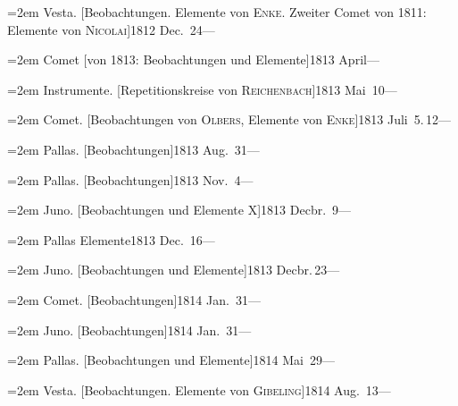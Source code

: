 \documentclass[12pt,a4paper]{article}
\begin{document}
{{{{{{{\vspace{0.5mm}
\noindent\hangindent=2em
Vesta. [Beobachtungen. Elemente von \textsc{Enke}. Zweiter Comet von 1811: Elemente von \textsc{Nicolai}]\hfill 1812 Dec.\ 24\quad ---

\vspace{0.5mm}
\noindent\hangindent=2em
Comet [von 1813: Beobachtungen und Elemente]\hfill 1813 April\quad ---

\vspace{0.5mm}
\noindent\hangindent=2em
Instrumente. [Repetitionskreise von \textsc{Reichenbach}]\hfill 1813 Mai\ 10\quad ---

\vspace{0.5mm}
\noindent\hangindent=2em
Comet. [Beobachtungen von \textsc{Olbers}, Elemente von \textsc{Enke}]\hfill 1813 Juli\ 5.\,12\quad ---

\vspace{0.5mm}
\noindent\hangindent=2em
Pallas. [Beobachtungen]\hfill 1813 Aug.\ 31\quad ---

\vspace{0.5mm}
\noindent\hangindent=2em
Pallas. [Beobachtungen]\hfill 1813 Nov.\ 4\quad ---

\vspace{0.5mm}
\noindent\hangindent=2em
Juno. [Beobachtungen und Elemente X]\hfill 1813 Decbr.\ 9\quad ---

\vspace{0.5mm}
\noindent\hangindent=2em
Pallas Elemente\hfill 1813 Dec.\ 16\quad ---

\vspace{0.5mm}
\noindent\hangindent=2em
Juno. [Beobachtungen und Elemente]\hfill 1813 Decbr.\,23\quad ---

\vspace{0.5mm}
\noindent\hangindent=2em
Comet. [Beobachtungen]\hfill 1814 Jan.\ 31\quad ---

\vspace{0.5mm}
\noindent\hangindent=2em
Juno. [Beobachtungen]\hfill 1814 Jan.\ 31\quad ---

\vspace{0.5mm}
\noindent\hangindent=2em
Pallas. [Beobachtungen und Elemente]\hfill 1814 Mai\ 29\quad ---

\vspace{0.5mm}
\noindent\hangindent=2em
Vesta. [Beobachtungen. Elemente von \textsc{Gibeling}]\hfill 1814 Aug.\ 13\quad ---

}}}}}}}
\end{document}
